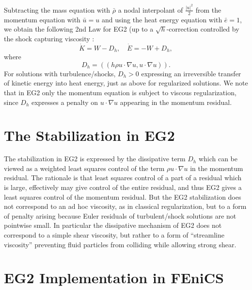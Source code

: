 Subtracting the mass equation with
$\bar\rho$ a nodal interpolant
of $\frac{\vert u\vert^2}{2}$
from the momentum equation
with  $\bar u=u$ and using the heat energy equation with $\bar e=1$, we obtain
the following 2nd Law for EG2 (up to a $\sqrt{h}$-correction controlled
by the shock capturing viscosity \cite{johnsonconslaw}:
\begin{equation}\label{2ndlawEG2}
\dot K = W-D_h,\quad \dot E=-W+D_h,
\end{equation}
where
\begin{equation}\label{tur_disp}
D_h=((h\rho u\cdot\nabla u,u\cdot\nabla u)).
\end{equation}
For solutions with turbulence/shocks, $D_h>0$ expressing an irreversible
transfer of kinetic energy into heat energy, just as above for regularized
solutions. We note that in EG2 only the momentum equation is
subject to viscous regularization, since $D_h$ expresses a
penalty on $u\cdot\nabla u$ appearing in the momentum residual.

\section{The Stabilization in EG2}

The stabilization in EG2 is expressed by the dissipative term $D_h$
which can be viewed as a weighted least squares control
of the term $\rho u\cdot\nabla u$ in the momentum residual.
The rationale is that least squares control of a
part of a residual which is large, effectively may
give control of the entire residual, and thus EG2
gives a least squares control of the
momentum residual. But the EG2 stabilization does not correspond
to an ad hoc viscosity, as in classical regularization, but to
a form of penalty arising because Euler residuals
of turbulent/shock solutions are not pointwise small. In particular
the dissipative mechanism of EG2 does not correspond to a
simple shear viscosity, but rather to a form of ``streamline viscosity''
preventing fluid particles from colliding while allowing strong shear.

\section{EG2 Implementation in FEniCS}

